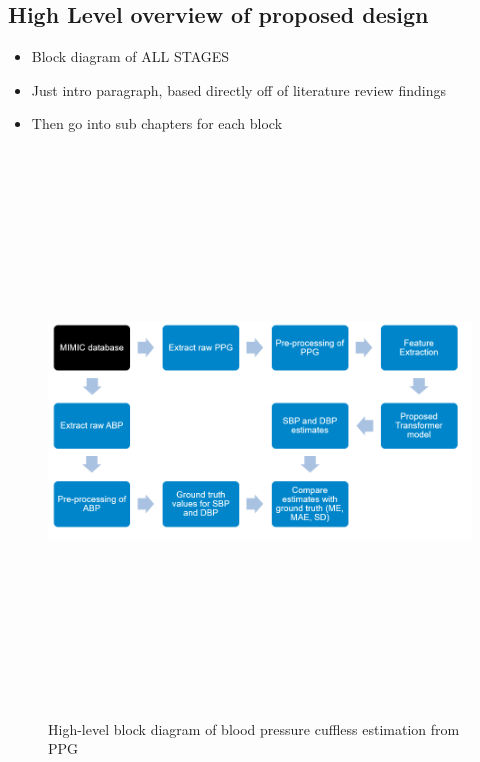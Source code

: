 \subsection{High Level overview of proposed design}

\begin{itemize}
    \item Block diagram of ALL STAGES
    \item Just intro paragraph, based directly off of literature review findings
    \item Then go into sub chapters for each block
\end{itemize}

\begin{figure}[H]
    \centering
    \includegraphics[width=15cm,height=15cm,keepaspectratio]{AnalysisDesign/blockDiag.png}
    \caption{High-level block diagram of blood pressure cuffless estimation from PPG}
    \label{blockdiag}
\end{figure} 

